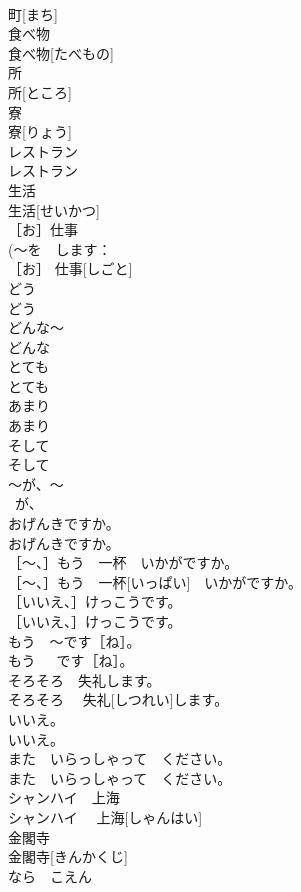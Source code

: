 \documentclass[8pt]{extreport}
\begin{document}
\begin{CJK}{UTF8}{min}
\\	町[まち]	
\\	食べ物	
\\	食べ物[たべもの]	
\\	所	
\\	所[ところ]	
\\	寮	
\\	寮[りょう]	
\\	レストラン	
\\	レストラン	
\\	生活	
\\	生活[せいかつ]	
\\	［お］仕事	
\\	(～を　します：
\\	［お］ 仕事[しごと]	
\\	どう	
\\	どう	
\\	どんな～	
\\	どんな~	
\\	とても	
\\	とても	
\\	あまり	
\\	あまり	
\\	そして	
\\	そして	
\\	～が、～	
\\	~が、~	
\\	おげんきですか。	
\\	おげんきですか。	
\\	［〜、］もう　一杯　いかがですか。	
\\	［〜、］もう　一杯[いっぱい]　いかがですか。	
\\	［いいえ、］けっこうです。	
\\	［いいえ、］けっこうです。	
\\	もう　～です［ね］。	
\\	もう　~です［ね］。	
\\	そろそろ　失礼します。	
\\	そろそろ　 失礼[しつれい]します。	
\\	いいえ。	
\\	いいえ。	
\\	また　いらっしゃって　ください。	
\\	また　いらっしゃって　ください。	
\\	シャンハイ　上海	
\\	シャンハイ　 上海[しゃんはい]	
\\	金閣寺	
\\	金閣寺[きんかくじ]	
\\	なら　こえん	

\end{CJK}
\end{document}
